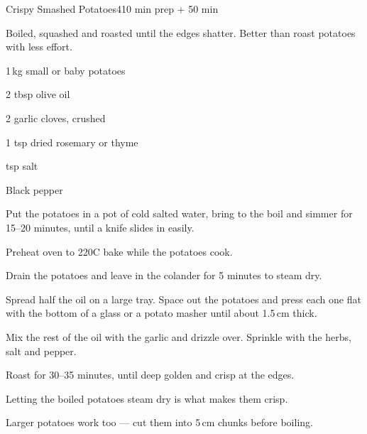\begin{recipebox}{Crispy Smashed Potatoes}{4}{10 min prep + 50 min}

Boiled, squashed and roasted until the edges shatter. Better than roast
potatoes with less effort.

\begin{ingredients}
  \item 1\,kg small or baby potatoes
  \item 2 tbsp olive oil
  \item 2 garlic cloves, crushed
  \item 1 tsp dried rosemary or thyme
  \item {} tsp salt
  \item Black pepper
\end{ingredients}

\begin{method}
  \item Put the potatoes in a pot of cold salted water, bring to the boil and simmer for 15--20 minutes, until a knife slides in easily.
  \item Preheat oven to 220\degree C bake while the potatoes cook.
  \item Drain the potatoes and leave in the colander for 5 minutes to steam dry.
  \item Spread half the oil on a large tray. Space out the potatoes and press each one flat with the bottom of a glass or a potato masher until about 1.5\,cm thick.
  \item Mix the rest of the oil with the garlic and drizzle over. Sprinkle with the herbs, salt and pepper.
  \item Roast for 30--35 minutes, until deep golden and crisp at the edges.
\end{method}

\begin{notelist}
  \item Letting the boiled potatoes steam dry is what makes them crisp.
  \item Larger potatoes work too --- cut them into 5\,cm chunks before boiling.
\end{notelist}

\end{recipebox}
